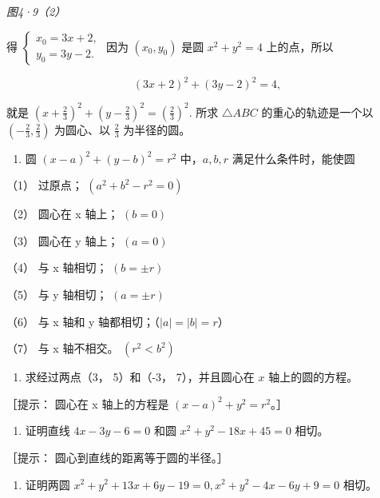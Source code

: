 \emph{图4·9（2）}

得
\(\left\{ \begin{array}{l} x_0 = 3x + 2, \\ y_0 = 3y - 2. \end{array} \right.\)
因为 \((x_0, y_0)\) 是圆 \(x^2 + y^2 = 4\) 上的点，所以

\[
(3 x + 2) ^ {2} + (3 y - 2) ^ {2} = 4,
\]

就是
\(\left(x + \frac{2}{3}\right)^2 +\left(y - \frac{2}{3}\right)^2 = \left(\frac{2}{3}\right)^2.\)
所求 \(\triangle ABC\) 的重心的轨迹是一个以
\(\left(-\frac{2}{3}, \frac{2}{3}\right)\) 为圆心、以 \(\frac{2}{3}\)
为半径的圆。

\begin{enumerate}
\def\labelenumi{\arabic{enumi}.}
\tightlist
\item
  圆 \((x - a)^2 + (y - b)^2 = r^2\) 中，\(a, b, r\)
  满足什么条件时，能使圆
\end{enumerate}

（1） 过原点； \((a^{2}+b^{2}-r^{2}=0)\)

（2） 圆心在 x 轴上； \((b=0)\)

（3） 圆心在 y 轴上； \((a=0)\)

（4） 与 x 轴相切； \((b=\pm r)\)

（5） 与 y 轴相切； \((a=\pm r)\)

（6） 与 x 轴和 y 轴都相切；（\(|a|=|b|=r\)）

（7） 与 x 轴不相交。 \((r^{2}<b^{2})\)

\begin{enumerate}
\def\labelenumi{\arabic{enumi}.}
\setcounter{enumi}{1}
\tightlist
\item
  求经过两点（3， 5）和（-3， 7），并且圆心在 \(x\) 轴上的圆的方程。
\end{enumerate}

［提示： 圆心在 x 轴上的方程是 \((x-a)^{2}+y^{2}=r^{2}\)。］

\begin{enumerate}
\def\labelenumi{\arabic{enumi}.}
\setcounter{enumi}{2}
\tightlist
\item
  证明直线 \(4x - 3y - 6 = 0\) 和圆 \(x^{2} + y^{2} - 18x + 45 = 0\)
  相切。
\end{enumerate}

［提示： 圆心到直线的距离等于圆的半径。］

\begin{enumerate}
\def\labelenumi{\arabic{enumi}.}
\setcounter{enumi}{3}
\tightlist
\item
  证明两圆
  \(x^{2} + y^{2} + 13x + 6y - 19 = 0, x^{2} + y^{2} - 4x - 6y + 9 = 0\)
  相切。
\end{enumerate}

